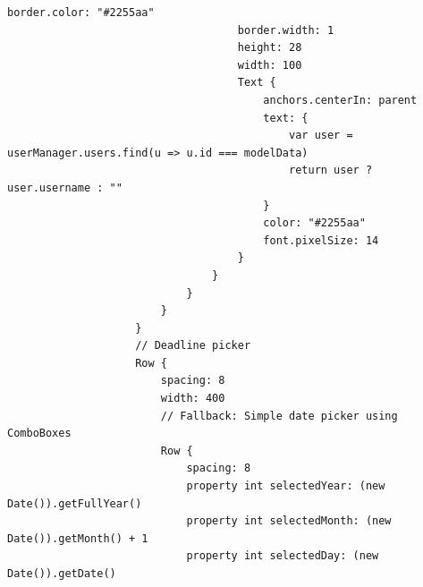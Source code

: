 \documentclass{report}
\begin{document}
\begin{lstlisting}[style=qmlstyle]
                                    border.color: "#2255aa"
                                    border.width: 1
                                    height: 28
                                    width: 100
                                    Text {
                                        anchors.centerIn: parent
                                        text: {
                                            var user = userManager.users.find(u => u.id === modelData)
                                            return user ? user.username : ""
                                        }
                                        color: "#2255aa"
                                        font.pixelSize: 14
                                    }
                                }
                            }
                        }
                    }
                    // Deadline picker
                    Row {
                        spacing: 8
                        width: 400
                        // Fallback: Simple date picker using ComboBoxes
                        Row {
                            spacing: 8
                            property int selectedYear: (new Date()).getFullYear()
                            property int selectedMonth: (new Date()).getMonth() + 1
                            property int selectedDay: (new Date()).getDate()
    

\end{lstlisting}
\end{document}
